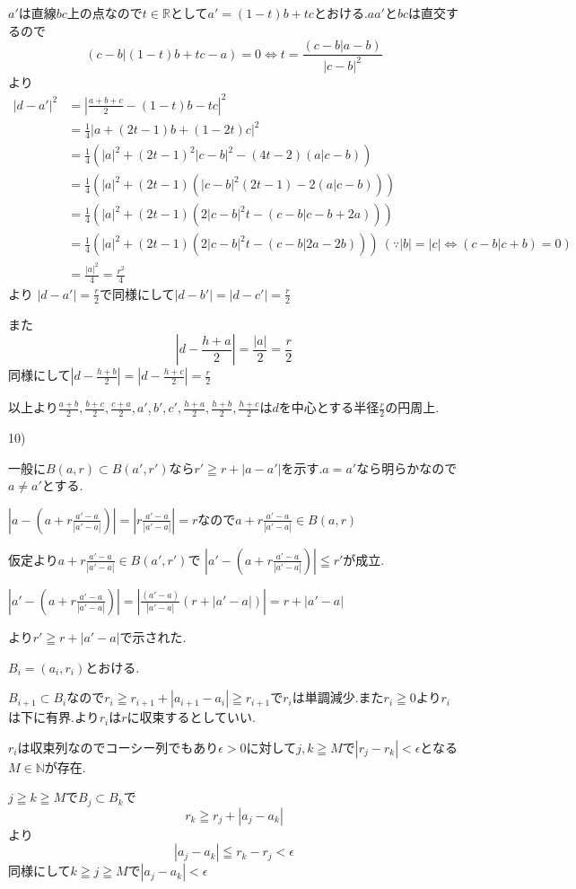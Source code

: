 \documentclass{jsarticle}
\begin{document}
$a'$は直線$bc$上の点なので$t\in\mathbb{R}$として$a'=(1-t)b+tc$とおける.$aa'$と$bc$は直交するので
\[(c-b|(1-t)b+tc-a)=0\Leftrightarrow t=\frac{(c-b|a-b)}{|c-b|^2}\]
より
\begin{align*}
|d-a'|^2 &= |\frac{a+b+c}{2}-(1-t)b-tc|^2\\
&= \frac{1}{4}|a+(2t-1)b+(1-2t)c|^2\\
&= \frac{1}{4}(|a|^2+(2t-1)^2|c-b|^2 - (4t-2)(a|c-b))\\
&= \frac{1}{4}(|a|^2+(2t-1)(|c-b|^2(2t-1) - 2(a|c-b)))\\
&= \frac{1}{4}(|a|^2+(2t-1)(2|c-b|^2t-(c-b|c-b+2a)))\\
&= \frac{1}{4}(|a|^2+(2t-1)(2|c-b|^2t-(c-b|2a-2b))) \ (\because |b|=|c| \Leftrightarrow (c-b|c+b)=0)\\
&=\frac{|a|^2}{4}=\frac{r^2}{4}
\end{align*}
より
$|d-a'|=\frac{r}{2}$で同様にして$|d-b'|=|d-c'|=\frac{r}{2}$

また
\[|d-\frac{h+a}{2}|=\frac{|a|}{2}=\frac{r}{2}\]
同様にして$|d-\frac{h+b}{2}|=|d-\frac{h+c}{2}|=\frac{r}{2}$

以上より$\frac{a+b}{2},\frac{b+c}{2},\frac{c+a}{2},a',b',c',\frac{h+a}{2},\frac{h+b}{2},\frac{h+c}{2}$は$d$を中心とする半径$\frac{r}{2}$の円周上.

10)

一般に$B(a,r)\subset B(a',r')$なら$r' \geqq r+|a-a'|$を示す.$a=a'$なら明らかなので$a\neq a'$とする.

$|a-(a+r\frac{a'-a}{|a'-a|})|=|r\frac{a'-a}{|a'-a|}|=r$なので$a+r\frac{a'-a}{|a'-a|}\in B(a,r)$

仮定より$a+r\frac{a'-a}{|a'-a|}\in B(a',r')$で
$|a'-(a+r\frac{a'-a}{|a'-a|})|\leqq r'$が成立.

$|a'-(a+r\frac{a'-a}{|a'-a|})|=|\frac{(a'-a)}{|a'-a|}(r+|a'-a|)|=r+|a'-a|$

より$r'\geqq r+|a'-a|$で示された.

$B_i=(a_i,r_i)$とおける.

$B_{i+1}\subset B_i$なので$r_i \geqq r_{i+1} + |a_{i+1}-a_i|\geqq r_{i+1}$で$r_i$は単調減少.また$r_i\geqq 0$より$r_i$は下に有界.より$r_i$は$r$に収束するとしていい.

$r_i$は収束列なのでコーシー列でもあり$\epsilon > 0$に対して$j,k\geqq M$で$|r_j-r_k|<\epsilon $となる$M\in\mathbb{N}$が存在.

$j\geqq k\geqq M$で$B_j\subset B_k$で
\[r_k \geqq r_j + |a_j-a_k|\]
より
\[|a_j-a_k|\leqq r_k-r_j < \epsilon\]
同様にして$k\geqq j\geqq M$で$|a_j-a_k| < \epsilon$
\end{document}
